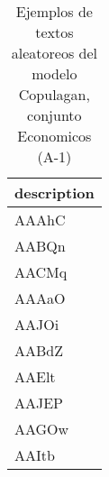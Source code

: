 \begin{table}[H]
\centering
\fontsize{8}{14}\selectfont
\caption{Ejemplos de textos aleatoreos del modelo Copulagan, conjunto Economicos (A-1)}
\label{table-sample10-economicos-a-1-copulagan-text}
\begin{tabular}{|m{50em}|}
\hline
\rowcolor[gray]{0.8}
description \\
\hline AAAhC \\
\hline AABQn \\
\hline AACMq \\
\hline AAAaO \\
\hline AAJOi \\
\hline AABdZ \\
\hline AAElt \\
\hline AAJEP \\
\hline AAGOw \\
\hline AAItb \\
\hline
\end{tabular}
\end{table}
